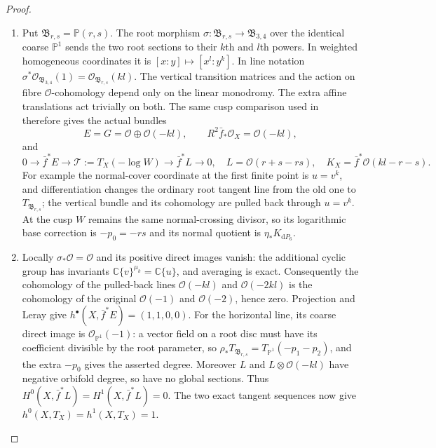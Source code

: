 \begin{proof}

\begin{enumerate}[label=\arabic*.,leftmargin=*]
\item Put $\mathfrak B_{r,s}=\mathbb P(r,s)$. The root morphism
$\sigma:\mathfrak B_{r,s}\to\mathfrak B_{3,4}$ over the identical
coarse $\mathbb P^1$ sends the two root sections to their $k$th and
$l$th powers. In weighted homogeneous coordinates it is
$[x:y]\mapsto[x^l:y^k]$. In line notation
$\sigma^*\mathcal O_{\mathfrak B_{3,4}}(1)
=\mathcal O_{\mathfrak B_{r,s}}(kl)$.
The vertical transition matrices and the action on fibre
$\mathcal O$-cohomology depend only on the linear monodromy.
The extra affine translations act trivially on both. The same
cusp comparison used in  therefore gives the actual bundles
\[
 E=G=\mathcal O\oplus\mathcal O(-kl),\qquad
 R^2\bar f_*\mathcal O_X=\mathcal O(-kl),
\]
and
\[
0\to\bar f^*E\to\mathcal T:=T_X(-\log W)
 \to\bar f^*L\to0,
\quad L=\mathcal O(r+s-rs),
\quad K_X=\bar f^*\mathcal O(kl-r-s).
\]
For example the normal-cover coordinate at the first finite point
is $u=v^k$, and differentiation changes the ordinary root tangent
line from the old one to $T_{\mathfrak B_{r,s}}$; the vertical
bundle and its cohomology are pulled back through $u=v^k$.
At the cusp $W$ remains the same
normal-crossing divisor, so its logarithmic base correction is
$-p_0=-rs$ and its normal quotient is $\eta_*K_{\mathrm dP_6}$.

\item Locally $\sigma_*\mathcal O=\mathcal O$ and its positive direct
images vanish: the additional cyclic group has invariants
$\mathbb C\{v\}^{\mu_k}=\mathbb C\{u\}$, and averaging is
exact. Consequently the cohomology of the pulled-back lines
$\mathcal O(-kl)$ and $\mathcal O(-2kl)$ is the cohomology of
the original $\mathcal O(-1)$ and $\mathcal O(-2)$, hence zero.
Projection and Leray give
$h^\bullet(X,\bar f^*E)=(1,1,0,0)$.
For the horizontal line, its coarse direct image is
$\mathcal O_{\mathbb P^1}(-1)$: a vector field on a root disc
must have its coefficient divisible by the root parameter,
so $\rho_*T_{\mathfrak B_{r,s}}=T_{\mathbb P^1}(-p_1-p_2)$,
and the extra $-p_0$ gives the asserted degree. Moreover
$L$ and $L\otimes\mathcal O(-kl)$ have negative orbifold degree,
so have no global sections. Thus
$H^0(X,\bar f^*L)=H^1(X,\bar f^*L)=0$.
The two exact tangent sequences now give
$h^0(X,T_X)=h^1(X,T_X)=1$.


\end{enumerate}
\end{proof}
